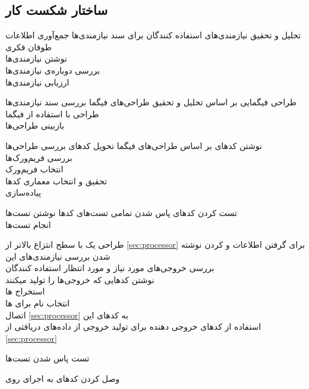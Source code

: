 \subsection{ساختار شکست کار}
\begin{wbsbox}{}
\begin{wbssub}
{تحلیل و تحقیق نیازمندی‌های استفاده کنندگان  برای }
{سند نیازمندی‌ها}
\task
جمع‌آوری اطلاعات \\
\task 
طوفان فکری \\
\task 
نوشتن نیازمندی‌ها \\
\task
بررسی دوباره‌ی نیازمندی‌ها \\
\task 
ارزیابی نیازمندی‌ها
\end{wbssub}

\begin{wbssub}
{طراحی فیگمایی  بر اساس تحلیل و تحقیق }
{طراحی‌های فیگما}
\task 
بررسی سند نیازمندی‌‌ها \\
\task 
طراحی با استفاده از فیگما \\
\task 
بازبینی طراحی‌ها
\end{wbssub}

\begin{wbssub}
{نوشتن کد‌‌های  بر اساس طراحی‌های فیگما}
{تحویل کد‌های }
\task 
بررسی طراحی‌ها \\
\task 
بررسی فریم‌ورک‌‌ها \\
\task 
انتخاب فریم‌ورک \\
\task 
تحقیق و انتخاب معماری کد‌ها \\
\task 
پیاده‌سازی
\end{wbssub}

\begin{wbssub}
{تست کردن کد‌های }
{پاس شدن تمامی تست‌های کد‌ها}
\task 
نوشتن تست‌ها \\
\task
انجام تست‌ها
\end{wbssub}

\begin{wbssub}
{طراحی یک  با سطح انتزاع بالاتر از \ref{sec:processor} برای گرفتن اطلاعات و  کردن}
{نوشته شدن }
\task
بررسی نیازمندی‌های این  \\
\task
بررسی خروجی‌های مورد نیاز و مورد انتظار استفاده کنندگان \\
\task
نوشتن کد‌هایی که خروجی‌ها را تولید میکنند \\
\task
استخراج ها \\
\task 
انتخاب نام برای ها \\
\task
اتصال 
\ref{sec:processor}
به کد‌های این  \\
\task
استفاده از کد‌‌های خروجی دهنده برای تولید خروجی از داده‌های دریافتی از 
\ref{sec:processor}
\end{wbssub}

\begin{wbssub}
{تست }
{پاس شدن تست‌ها}
\end{wbssub}

\begin{wbssub}
{وصل کردن کد‌های  به }
{اجرای  روی }
\end{wbssub}
\end{wbsbox}
